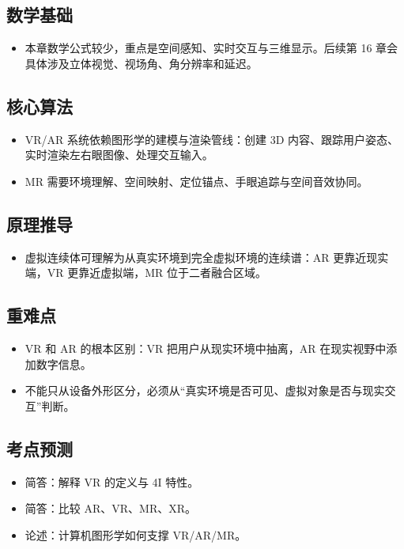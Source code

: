 \documentclass[UTF8,zihao=-4,scheme=chinese,fontset=fandol]{ctexart}
\begin{document}
\subsection{数学基础}
\begin{itemize}
  \item 本章数学公式较少，重点是空间感知、实时交互与三维显示。后续第 16 章会具体涉及立体视觉、视场角、角分辨率和延迟。
\end{itemize}

\subsection{核心算法}
\begin{itemize}
  \item VR/AR 系统依赖图形学的建模与渲染管线：创建 3D 内容、跟踪用户姿态、实时渲染左右眼图像、处理交互输入。
  \item MR 需要环境理解、空间映射、定位锚点、手眼追踪与空间音效协同。
\end{itemize}

\subsection{原理推导}
\begin{itemize}
  \item 虚拟连续体可理解为从真实环境到完全虚拟环境的连续谱：AR 更靠近现实端，VR 更靠近虚拟端，MR 位于二者融合区域。
\end{itemize}

\subsection{重难点}
\begin{itemize}
  \item VR 和 AR 的根本区别：VR 把用户从现实环境中抽离，AR 在现实视野中添加数字信息。
  \item 不能只从设备外形区分，必须从“真实环境是否可见、虚拟对象是否与现实交互”判断。
\end{itemize}

\subsection{考点预测}
\begin{itemize}
  \item 简答：解释 VR 的定义与 4I 特性。
  \item 简答：比较 AR、VR、MR、XR。
  \item 论述：计算机图形学如何支撑 VR/AR/MR。
\end{itemize}
\end{document}
